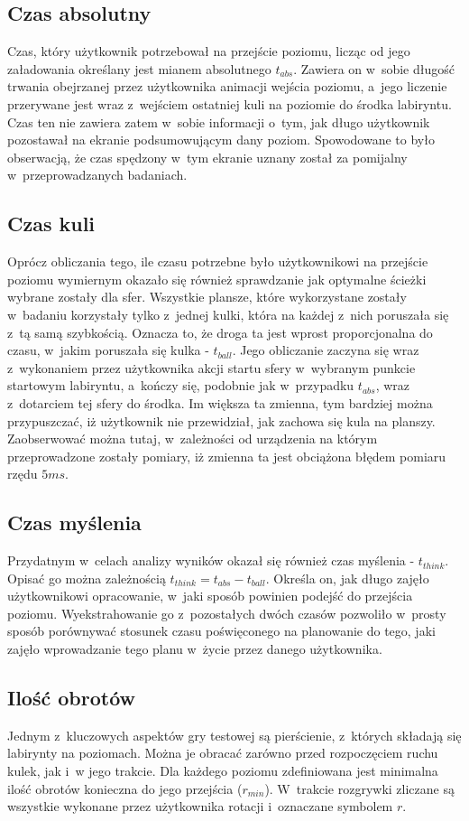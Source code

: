 \documentclass[a4paper,12pt,numbers=noenddot]{report}
\begin{document}
	\subsection{Czas absolutny}
Czas, który użytkownik potrzebował na przejście poziomu, licząc od jego załadowania określany jest mianem absolutnego $t_{abs}$. Zawiera on w~sobie długość trwania obejrzanej przez użytkownika animacji wejścia poziomu, a~jego liczenie przerywane jest wraz z~wejściem ostatniej kuli na poziomie do środka labiryntu. Czas ten nie zawiera zatem w~sobie informacji o~tym, jak długo użytkownik pozostawał na ekranie podsumowującym dany poziom. Spowodowane to było obserwacją, że czas spędzony w~tym ekranie uznany został za pomijalny w~przeprowadzanych badaniach.
	\subsection{Czas kuli}
Oprócz obliczania tego, ile czasu potrzebne było użytkownikowi na przejście poziomu wymiernym okazało się również sprawdzanie jak optymalne ścieżki wybrane zostały dla sfer. Wszystkie plansze, które wykorzystane zostały w~badaniu korzystały tylko z~jednej kulki, która na każdej z~nich poruszała się z~tą samą szybkością. Oznacza to, że droga ta jest wprost proporcjonalna do czasu, w~jakim poruszała się kulka - $t_{ball}$. Jego obliczanie zaczyna się wraz z~wykonaniem przez użytkownika akcji startu sfery w~wybranym punkcie startowym labiryntu, a~kończy się, podobnie jak w~przypadku $t_{abs}$, wraz z~dotarciem tej sfery do środka. Im większa ta zmienna, tym bardziej można przypuszczać, iż użytkownik nie przewidział, jak zachowa się kula na planszy. Zaobserwować można tutaj, w~zależności od urządzenia na którym przeprowadzone zostały pomiary, iż zmienna ta jest obciążona błędem pomiaru rzędu $5 ms$.
	\subsection{Czas myślenia}
Przydatnym w~celach analizy wyników okazał się również czas myślenia - $t_{think}$. Opisać go można zależnością $t_{think} = t_{abs} - t_{ball}$. Określa on, jak długo zajęło użytkownikowi opracowanie, w~jaki sposób powinien podejść do przejścia poziomu. Wyekstrahowanie go z~pozostałych dwóch czasów pozwoliło w~prosty sposób porównywać stosunek czasu poświęconego na planowanie do tego, jaki zajęło wprowadzanie tego planu w~życie przez danego użytkownika.
	\subsection{Ilość obrotów}
Jednym z~kluczowych aspektów gry testowej są pierścienie, z~których składają się labirynty na poziomach. Można je obracać zarówno przed rozpoczęciem ruchu kulek, jak i~w jego trakcie. Dla każdego poziomu zdefiniowana jest minimalna ilość obrotów konieczna do jego przejścia ($r_{min}$). W~trakcie rozgrywki zliczane są wszystkie wykonane przez użytkownika rotacji i~oznaczane symbolem $r$. 
\end{document}
